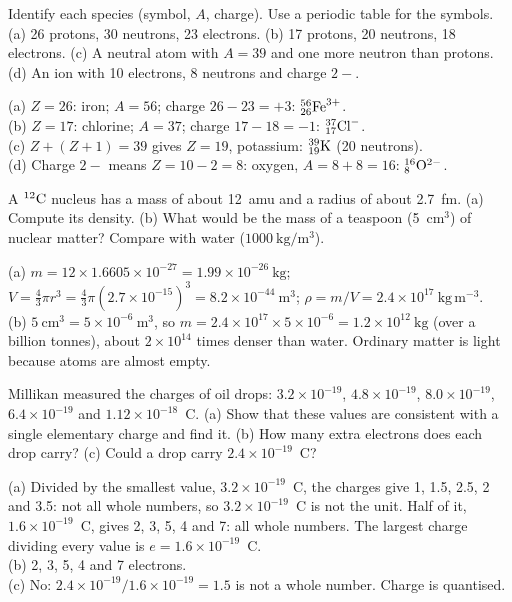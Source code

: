 Identify each species (symbol, $A$, charge). Use a periodic table for the symbols.
(a) 26 protons, 30 neutrons, 23 electrons. (b) 17 protons, 20 neutrons, 18 electrons.
(c) A neutral atom with $A = 39$ and one more neutron than protons.
(d) An ion with 10 electrons, 8 neutrons and charge $2-$.
\begin{solution}
(a) $Z = 26$: iron; $A = 56$; charge $26 - 23 = +3$: ${}^{56}_{26}\mathrm{Fe}^{3+}$.\\
(b) $Z = 17$: chlorine; $A = 37$; charge $17 - 18 = -1$: ${}^{37}_{17}\mathrm{Cl}^{-}$.\\
(c) $Z + (Z+1) = 39$ gives $Z = 19$, potassium: ${}^{39}_{19}\mathrm{K}$ (20 neutrons).\\
(d) Charge $2-$ means $Z = 10 - 2 = 8$: oxygen, $A = 8 + 8 = 16$: ${}^{16}_{8}\mathrm{O}^{2-}$.
\end{solution}

A ${}^{12}\mathrm{C}$ nucleus has a mass of about 12~amu and a radius of about 2.7~fm. (a) Compute its
density. (b) What would be the mass of a teaspoon (5~cm$^3$) of nuclear matter? Compare with water
($\SI{1000}{\kilo\gram\per\metre\cubed}$).
\begin{solution}
(a) $m = 12\times1.6605\times10^{-27} = 1.99\times10^{-26}\ \mathrm{kg}$;
$V = \tfrac43\pi r^3 = \tfrac43\pi(2.7\times10^{-15})^3 = 8.2\times10^{-44}\ \mathrm{m^3}$;
$\rho = m/V = 2.4\times10^{17}\ \mathrm{kg\,m^{-3}}$.\\
(b) $5\ \mathrm{cm^3} = 5\times10^{-6}\ \mathrm{m^3}$, so $m = 2.4\times10^{17}\times5\times10^{-6}
= 1.2\times10^{12}\ \mathrm{kg}$ (over a billion tonnes), about $2\times10^{14}$ times denser than water.
Ordinary matter is light because atoms are almost empty.
\end{solution}

Millikan measured the charges of oil drops: $3.2\times10^{-19}$, $4.8\times10^{-19}$,
$8.0\times10^{-19}$, $6.4\times10^{-19}$ and $1.12\times10^{-18}$~C. (a) Show that these values are
consistent with a single elementary charge and find it. (b) How many extra electrons does each drop
carry? (c) Could a drop carry $2.4\times10^{-19}$~C?
\begin{solution}
(a) Divided by the smallest value, $3.2\times10^{-19}$~C, the charges give 1, 1.5, 2.5, 2 and 3.5: not
all whole numbers, so $3.2\times10^{-19}$~C is not the unit. Half of it, $1.6\times10^{-19}$~C, gives
2, 3, 5, 4 and 7: all whole numbers. The largest charge dividing every value is
$e = 1.6\times10^{-19}$~C.\\
(b) 2, 3, 5, 4 and 7 electrons.\\
(c) No: $2.4\times10^{-19}/1.6\times10^{-19} = 1.5$ is not a whole number. Charge is quantised.
\end{solution}

